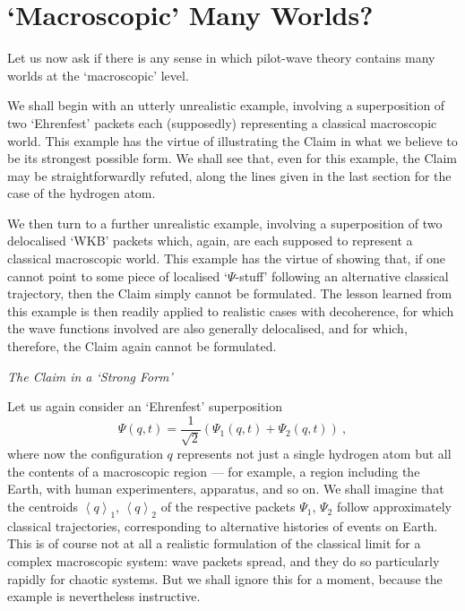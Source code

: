 \documentclass{article}%
\begin{document}
\section{`Macroscopic' Many Worlds?}

Let us now ask if there is any sense in which pilot-wave theory contains many
worlds at the `macroscopic' level.

We shall begin with an utterly unrealistic example, involving a superposition
of two `Ehrenfest' packets each (supposedly) representing a classical
macroscopic world. This example has the virtue of illustrating the Claim in
what we believe to be its strongest possible form. We shall see that, even for
this example, the Claim may be straightforwardly refuted, along the lines
given in the last section for the case of the hydrogen atom.

We then turn to a further unrealistic example, involving a superposition of
two delocalised `WKB' packets which, again, are each supposed to represent a
classical macroscopic world. This example has the virtue of showing that, if
one cannot point to some piece of localised `$\Psi$-stuff' following an
alternative classical trajectory, then the Claim simply cannot be formulated.
The lesson learned from this example is then readily applied to realistic
cases with decoherence, for which the wave functions involved are also
generally delocalised, and for which, therefore, the Claim again cannot be formulated.

\begin{center}
\textit{The Claim in a `Strong Form'}
\end{center}

Let us again consider an `Ehrenfest' superposition%
\[
\Psi(q,t)=\frac{1}{\sqrt{2}}\left(  \Psi_{1}(q,t)+\Psi_{2}(q,t)\right)  \ ,
\]
where now the configuration $q$ represents not just a single hydrogen atom but
all the contents of a macroscopic region --- for example, a region including
the Earth, with human experimenters, apparatus, and so on. We shall imagine
that the centroids $\left\langle q\right\rangle _{1}$, $\left\langle
q\right\rangle _{2}$ of the respective packets $\Psi_{1}$, $\Psi_{2}$ follow
approximately classical trajectories, corresponding to alternative histories
of events on Earth. This is of course not at all a realistic formulation of
the classical limit for a complex macroscopic system: wave packets spread, and
they do so particularly rapidly for chaotic systems. But we shall ignore this
for a moment, because the example is nevertheless instructive.
\end{document}
